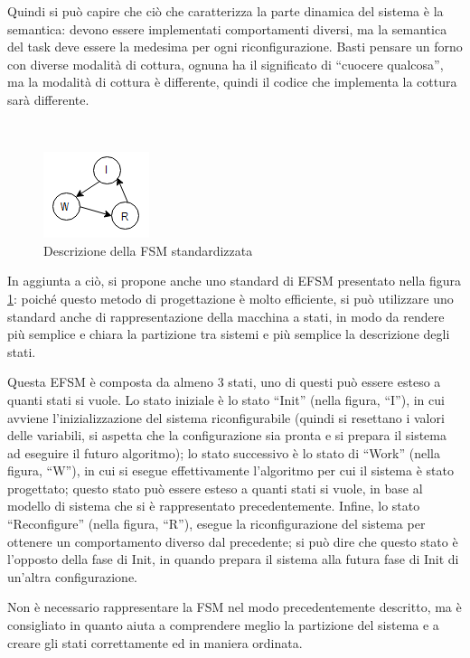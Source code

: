 \documentclass[a4paper,titlepage]{book}
\begin{document}
Quindi si può capire che ciò che caratterizza la parte dinamica del sistema è la semantica: devono essere implementati comportamenti diversi, ma la semantica del task deve essere la medesima per ogni riconfigurazione. Basti pensare un forno con diverse modalità di cottura, ognuna ha il significato di ``cuocere qualcosa'', ma la modalità di cottura è differente, quindi il codice che implementa la cottura sarà differente.

~ 

\begin{figure}[!ht]
\centering
\includegraphics[scale=1.5]{fsm.png}
\caption{Descrizione della FSM standardizzata}\label{fig:8}
\end{figure}

In aggiunta a ciò, si propone anche uno standard di EFSM presentato nella figura \ref{fig:8}: poiché questo metodo di progettazione è molto efficiente, si può utilizzare uno standard anche di rappresentazione della macchina a stati, in modo da rendere più semplice e chiara la partizione tra sistemi e più semplice la descrizione degli stati.

Questa EFSM è composta da almeno 3 stati, uno di questi può essere esteso a quanti stati si vuole. Lo stato iniziale è lo stato ``Init'' (nella figura, ``I''), in cui avviene l'inizializzazione del sistema riconfigurabile (quindi si resettano i valori delle variabili, si aspetta che la configurazione sia pronta e si prepara il sistema ad eseguire il futuro algoritmo); lo stato successivo è lo stato di ``Work'' (nella figura, ``W''), in cui si esegue effettivamente l'algoritmo per cui il sistema è stato progettato; questo stato può essere esteso a quanti stati si vuole, in base al modello di sistema che si è rappresentato precedentemente. Infine, lo stato ``Reconfigure'' (nella figura, ``R''), esegue la riconfigurazione del sistema per ottenere un comportamento diverso dal precedente; si può dire che questo stato è l'opposto della fase di Init, in quando prepara il sistema alla futura fase di Init di un'altra configurazione.

Non è necessario rappresentare la FSM nel modo precedentemente descritto, ma è consigliato in quanto aiuta a comprendere meglio la partizione del sistema e a creare gli stati correttamente ed in maniera ordinata.
\end{document}
